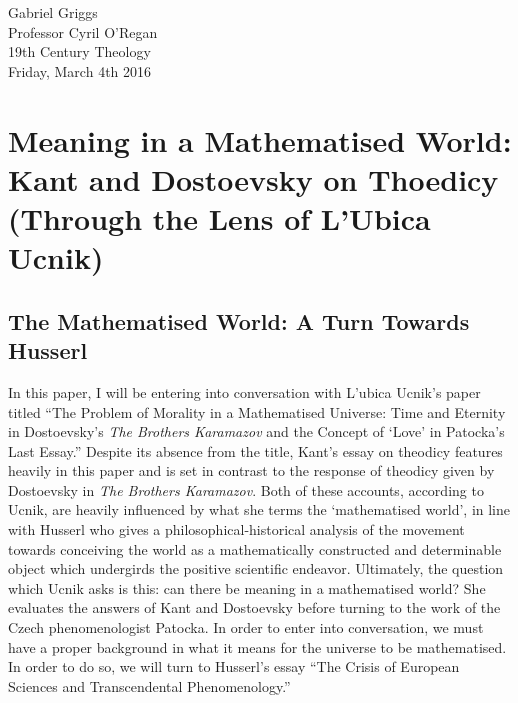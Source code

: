 \documentclass[12pt]{article}
\begin{document}
\singlespacing
{\raggedleft{}Gabriel Griggs} \\
Professor Cyril O'Regan \\
19th Century Theology \\
Friday, March 4th 2016\\

\section*{Meaning in a Mathematised World: Kant and Dostoevsky on Thoedicy (Through the Lens of L'Ubica Ucnik)}

\doublespacing
\subsection*{The Mathematised World: A Turn Towards Husserl}

In this paper, I will be entering into conversation with L'ubica Ucnik's paper titled ``The Problem of Morality in a Mathematised Universe: Time and Eternity in Dostoevsky's \emph{The Brothers Karamazov} and the Concept of `Love' in Patocka's Last Essay.'' Despite its absence from the title, Kant's essay on theodicy features heavily in this paper and is set in contrast to the response of theodicy given by Dostoevsky in \emph{The Brothers Karamazov}. Both of these accounts, according to Ucnik, are heavily influenced by what she terms the `mathematised world', in line with Husserl who gives a philosophical-historical analysis of the movement towards conceiving the world as a mathematically constructed and determinable object which undergirds the positive scientific endeavor. Ultimately, the question which Ucnik asks is this: can there be meaning in a mathematised world? She evaluates the answers of Kant and Dostoevsky before turning to the work of the Czech phenomenologist Patocka. In order to enter into conversation, we must have a proper background in what it means for the universe to be mathematised. In order to do so, we will turn to Husserl's essay ``The Crisis of European Sciences and Transcendental Phenomenology.'' 
\end{document}
